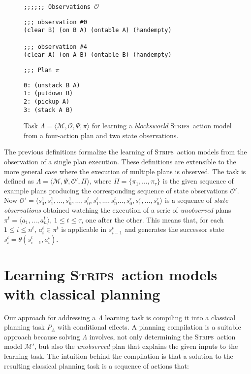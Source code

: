 \documentclass[3p,times]{elsarticle}
\newcommand{\strips}{\textsc{Strips}}     %
\newcommand{\tup}[1]{{\langle #1 \rangle}}
\begin{document}
\begin{figure}[hbt!]
{\footnotesize\tt ;;;;;; Observations $\mathcal{O}$}
\begin{footnotesize}
\begin{verbatim}
;;; observation #0
(clear B) (on B A) (ontable A) (handempty)

;;; observation #4
(clear A) (on A B) (ontable B) (handempty)
\end{verbatim}
\end{footnotesize}

{\footnotesize\tt ;;; Plan $\pi$}
\begin{footnotesize}
\begin{verbatim}
0: (unstack B A)
1: (putdown B)
2: (pickup A)
3: (stack A B)
\end{verbatim}
\end{footnotesize}

 \caption{\small Task $\Lambda=\tup{\mathcal{M},\mathcal{O},\Psi,\pi}$ for learning a {\em blocksworld} \strips\ action model from a four-action plan and two state observations.}
\label{fig:example-plans}
\end{figure}

The previous definitions formalize the learning of \strips\ action models from the observation of a single plan execution. These definitions are extensible to the more general case where the execution of multiple plans is observed. The task is defined as $\Lambda=\tup{\mathcal{M},\Psi,\mathcal{O'},\Pi}$, where $\Pi=\{\pi_1,\ldots,\pi_{\tau}\}$ is the given sequence of example plans producing the corresponding sequence of state observations $\mathcal{O'}$. Now $\mathcal{O'}=\tup{s_0^1,s_1^1,\ldots,s_{n}^1,\ldots,s_0^t,s_1^t,\ldots,s_{n}^t\ldots,s_0^{\tau},s_1^{\tau},\ldots,s_{n}^{\tau}}$ is a sequence of {\em state observations} obtained watching the execution of a serie of {\em unobserved} plans $\pi^t=\tup{a_1, \ldots, a_n^t}$, {\tt\small $1\leq t\leq \tau$}, one after the other. This means that, for each {\small $1\leq i\leq n^t$}, $a_i^t\in \pi^t$ is applicable in $s_{i-1}^t$ and generates the successor state $s_i^t=\theta(s_{i-1}^t,a_i^t)$.



\section{Learning \strips\ action models with classical planning}
\label{sec:Section5}
Our approach for addressing a $\Lambda$ learning task is compiling it into a classical planning task $P_{\Lambda}$ with conditional effects. A planning compilation is a suitable approach because solving $\Lambda$ involves, not only determining the \strips\ action model $\mathcal{M}'$, but also the {\em unobserved} plan that explains the given inputs to the learning task. The intuition behind the compilation is that a solution to the resulting classical planning task is a sequence of actions that:
\end{document}
